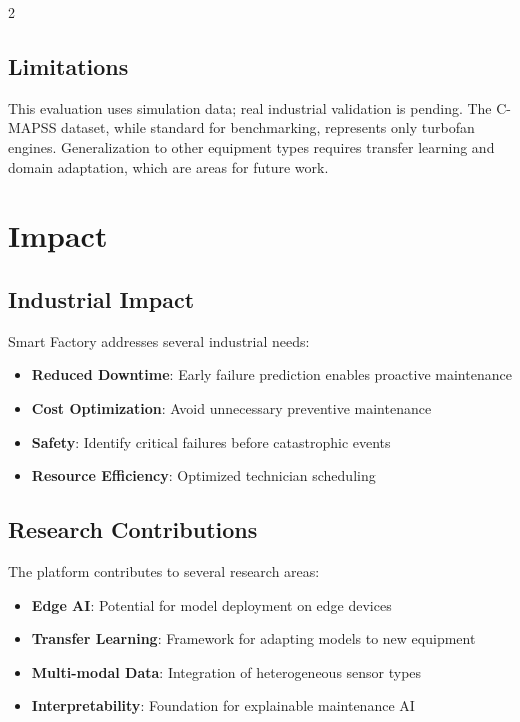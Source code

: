 \documentclass{ijceds} %
\begin{document}
\begin{multicols}{2}
\subsection{Limitations}

This evaluation uses simulation data; real industrial validation is pending. The C-MAPSS dataset, while standard for benchmarking, represents only turbofan engines. Generalization to other equipment types requires transfer learning and domain adaptation, which are areas for future work.


\section{Impact}
\label{sec:impact}

\subsection{Industrial Impact}

Smart Factory addresses several industrial needs:

\begin{itemize}
    \item \textbf{Reduced Downtime}: Early failure prediction enables proactive maintenance
    \item \textbf{Cost Optimization}: Avoid unnecessary preventive maintenance
    \item \textbf{Safety}: Identify critical failures before catastrophic events
    \item \textbf{Resource Efficiency}: Optimized technician scheduling
\end{itemize}

\subsection{Research Contributions}

The platform contributes to several research areas:

\begin{itemize}
    \item \textbf{Edge AI}: Potential for model deployment on edge devices
    \item \textbf{Transfer Learning}: Framework for adapting models to new equipment
    \item \textbf{Multi-modal Data}: Integration of heterogeneous sensor types
    \item \textbf{Interpretability}: Foundation for explainable maintenance AI
\end{itemize}


\end{multicols}
\end{document}
